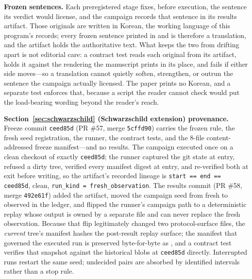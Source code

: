 \textbf{Frozen sentences.} Each preregistered stage fixes, before
execution, the sentence its verdict would license, and the campaign
records that sentence in its results artifact. Those originals are
written in Korean, the working language of this program's records; every
frozen sentence printed in  and
 is therefore a translation, and the artifact
holds the authoritative text. What keeps the two from drifting apart is
not editorial care: a contract test reads each original from its
artifact, holds it against the rendering the manuscript prints in its
place, and fails if either side moves---so a translation cannot quietly
soften, strengthen, or outrun the sentence the campaign actually
licensed. The paper prints no Korean, and a separate test enforces that,
because a script the reader cannot check would put the load-bearing
wording beyond the reader's reach.

\textbf{Section~\ref{sec:schwarzschild} (Schwarzschild extension)
provenance.} Freeze commit \texttt{ceed85d} (PR \#57, merge
\texttt{5cffd90}) carries the frozen rule, the fresh seed registration,
the runner, the contract tests, and the 8-file content-addressed freeze
manifest---and no results. The campaign executed once on a clean checkout
of exactly \texttt{ceed85d}; the runner captured the git state at entry,
refused a dirty tree, verified every manifest digest at entry, and
re-verified both at exit before writing, so the artifact's recorded
lineage is \texttt{start == end == ceed85d}, clean,
\texttt{run\_kind = fresh\_observation}. The results commit (PR \#58,
merge \texttt{492e61f}) added the artifact, moved the campaign seed from
fresh to observed in the ledger, and flipped the runner's campaign path
to a deterministic replay whose output is owned by a separate file and
can never replace the fresh observation. Because that flip legitimately
changed two protocol-surface files, the \emph{current} tree's manifest
hashes the post-result replay surface; the manifest that governed the
executed run is preserved byte-for-byte as
, and a
contract test verifies that snapshot against the historical blobs at
\texttt{ceed85d} directly. Interrupted runs restart the same seed;
undecided pairs are absorbed by identified intervals rather than a stop
rule.

